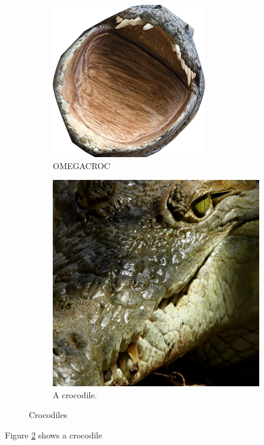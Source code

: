 \documentclass{article}
\begin{document}
	\begin{figure}[h!]
		\centering
		\begin{subfigure}[b]{0.4\linewidth}
			\includegraphics[width=\linewidth]{OMEGAVID.png}
			\caption{OMEGACROC}
		\end{subfigure}
		\begin{subfigure}[b]{0.4\linewidth}
			\includegraphics[width=\linewidth]{crocYES.png}
			\caption{A crocodile.}
			\label{fig: crocodile1}
		\end{subfigure}
	\caption{Crocodiles}
	\end{figure}

Figure \ref{fig: crocodile1} shows a crocodile
\end{document}
